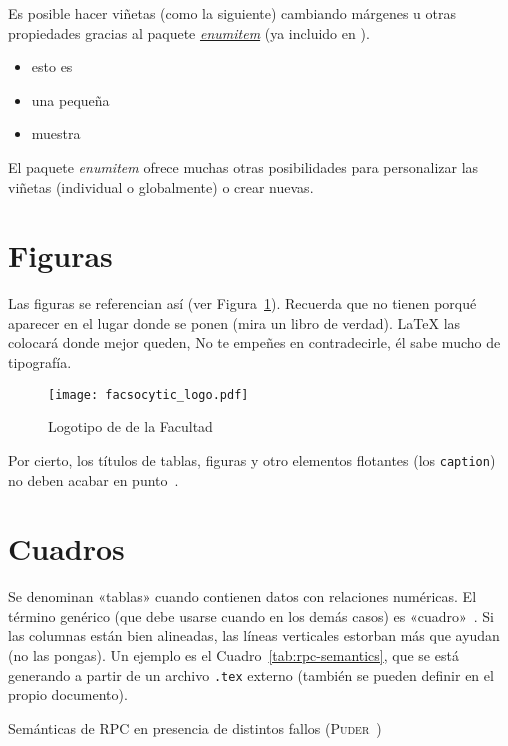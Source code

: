 Es posible hacer viñetas (como la siguiente) cambiando márgenes u otras propiedades gracias al paquete \href{http://mirror.ctan.org/macros/latex/contrib/enumitem/enumitem.pdf}{\emph{enumitem}} (ya incluido en \gitatfg).

\begin{itemize}[noitemsep, label=$\triangleright$]
  \item esto es
  \item una pequeña
  \item muestra
\end{itemize}

El paquete \emph{enumitem} ofrece muchas otras posibilidades para personalizar las viñetas (individual o globalmente) o crear nuevas.


\section{Figuras}

Las figuras se referencian así (ver Figura~\ref{fig:fac}). Recuerda que no tienen porqué aparecer en el lugar donde se ponen (mira un libro de verdad). \LaTeX{} las colocará donde mejor queden, No te empeñes en contradecirle, él sabe mucho de tipografía.

\begin{figure}[!h]
\begin{center}
  \texttt{[image: facsocytic\_logo.pdf]}
  \caption{Logotipo de de la Facultad}
  \label{fig:fac}
\end{center}
\end{figure}

Por cierto, los títulos de tablas, figuras y otro elementos flotantes (los \texttt{caption}) no deben acabar en punto~\cite{sousa}.


\section{Cuadros}
\label{sec:uncuadro}

Se denominan «tablas» cuando contienen datos con relaciones numéricas. El término genérico (que debe usarse cuando en los demás casos) es «cuadro»~\cite{sousa}. Si las columnas están bien alineadas, las líneas verticales estorban más que ayudan (no las pongas). Un ejemplo es el Cuadro~\ref{tab:rpc-semantics}, que se está generando a partir de un archivo \texttt{.tex} externo (también se pueden definir en el propio documento).

\begin{table}[hp]
  \centering
  {\small
  
  }
  \caption[Semánticas de \acs{RPC} en presencia de distintos fallos]{Semánticas de \acs{RPC} en presencia de distintos fallos (\textsc{Puder}~\cite{puder05:_distr_system_archit})}
  \label{tab:rpc-semantics}
\end{table}


